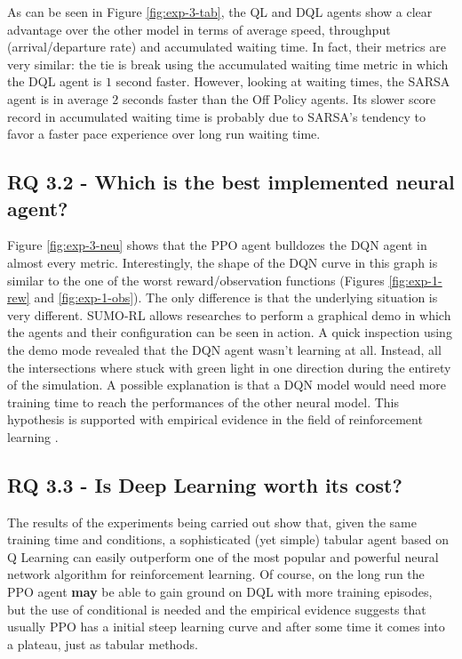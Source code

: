 As can be seen in Figure \ref{fig:exp-3-tab}, the QL and DQL agents show a clear advantage over the other model in terms of average speed, throughput (arrival/departure rate) and accumulated waiting time.
In fact, their metrics are very similar: the tie is break using the accumulated waiting time metric in which the DQL agent is $1$ second faster.
However, looking at waiting times, the SARSA agent is in average $2$ seconds faster than the Off Policy agents.
Its slower score record in accumulated waiting time is probably due to SARSA's tendency to favor a faster pace experience over long run waiting time.


\subsection{RQ 3.2 - Which is the best implemented neural agent?}

Figure \ref{fig:exp-3-neu} shows that the PPO agent bulldozes the DQN agent in almost every metric.
Interestingly, the shape of the DQN curve in this graph is similar to the one of the worst reward/observation functions (Figures \ref{fig:exp-1-rew} and \ref{fig:exp-1-obs}).
The only difference is that the underlying situation is very different.
SUMO-RL allows researches to perform a graphical demo in which the agents and their configuration can be seen in action.
A quick inspection using the demo mode revealed that the DQN agent wasn't learning at all.
Instead, all the intersections where stuck with green light in one direction during the entirety of the simulation.
A possible explanation is that a DQN model would need more training time to reach the performances of the other neural model.
This hypothesis is supported with empirical evidence in the field of reinforcement learning \cite{kozlica2023deep}.


\subsection{RQ 3.3 - Is Deep Learning worth its cost?}

The results of the experiments being carried out show that, given the same training time and conditions, a sophisticated (yet simple) tabular agent based on Q Learning can easily outperform one of the most popular and powerful neural network algorithm for reinforcement learning.
Of course, on the long run the PPO agent \textbf{may} be able to gain ground on DQL with more training episodes, but the use of conditional is needed and the empirical evidence \cite{kozlica2023deep} suggests that usually PPO has a initial steep learning curve and after some time it comes into a plateau, just as tabular methods.

